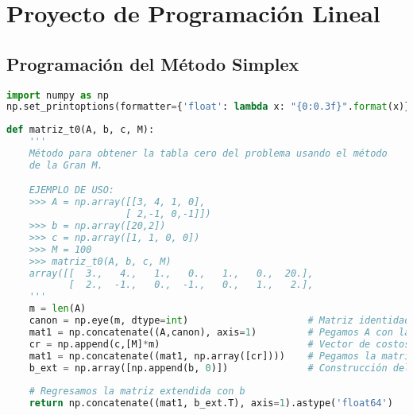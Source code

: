 \hypertarget{proyecto-de-programaciuxf3n-lineal}{%
\section{Proyecto de Programación
Lineal}\label{proyecto-de-programaciuxf3n-lineal}}

\hypertarget{programaciuxf3n-del-muxe9todo-simplex}{%
\subsection{Programación del Método
Simplex}\label{programaciuxf3n-del-muxe9todo-simplex}}

\begin{lstlisting}[language=Python]
import numpy as np
np.set_printoptions(formatter={'float': lambda x: "{0:0.3f}".format(x)}) # Para que enseñe nada más 3 decimales
\end{lstlisting}

\begin{lstlisting}[language=Python]
def matriz_t0(A, b, c, M):
    '''
    Método para obtener la tabla cero del problema usando el método
    de la Gran M.

    EJEMPLO DE USO:
    >>> A = np.array([[3, 4, 1, 0],
                     [ 2,-1, 0,-1]])
    >>> b = np.array([20,2])
    >>> c = np.array([1, 1, 0, 0])
    >>> M = 100
    >>> matriz_t0(A, b, c, M)
    array([[  3.,   4.,   1.,   0.,   1.,   0.,  20.],
           [  2.,  -1.,   0.,  -1.,   0.,   1.,   2.],                                                                             [  1.,   1.,   0.,   0., 100., 100.,   0.]])  
    '''
    m = len(A)
    canon = np.eye(m, dtype=int)                     # Matriz identidad mxm
    mat1 = np.concatenate((A,canon), axis=1)         # Pegamos A con la identidad
    cr = np.append(c,[M]*m)                          # Vector de costos relativos
    mat1 = np.concatenate((mat1, np.array([cr])))    # Pegamos la matriz con los costos relativos
    b_ext = np.array([np.append(b, 0)])              # Construcción del vector b
    
    # Regresamos la matriz extendida con b
    return np.concatenate((mat1, b_ext.T), axis=1).astype('float64')
\end{lstlisting}

